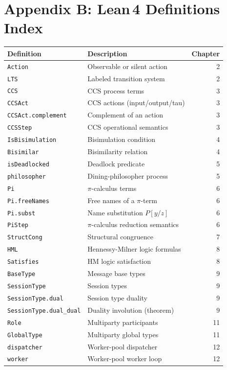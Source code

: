 \documentclass[11pt, a4paper, oneside]{book}
\newcommand{\lc}[1]{\texttt{#1}}
\begin{document}
\chapter*{Appendix B: Lean\,4 Definitions Index}

\begin{center}
\begin{tabular}{llr}
  \toprule
  \textbf{Definition} & \textbf{Description} & \textbf{Chapter} \\
  \midrule
  \lc{Action} & Observable or silent action & 2 \\
  \lc{LTS} & Labeled transition system & 2 \\
  \lc{CCS} & CCS process terms & 3 \\
  \lc{CCSAct} & CCS actions (input/output/tau) & 3 \\
  \lc{CCSAct.complement} & Complement of an action & 3 \\
  \lc{CCSStep} & CCS operational semantics & 3 \\
  \lc{IsBisimulation} & Bisimulation condition & 4 \\
  \lc{Bisimilar} & Bisimilarity relation & 4 \\
  \lc{isDeadlocked} & Deadlock predicate & 5 \\
  \lc{philosopher} & Dining-philosopher process & 5 \\
  \lc{Pi} & $\pi$-calculus terms & 6 \\
  \lc{Pi.freeNames} & Free names of a $\pi$-term & 6 \\
  \lc{Pi.subst} & Name substitution $P[y/z]$ & 6 \\
  \lc{PiStep} & $\pi$-calculus reduction semantics & 6 \\
  \lc{StructCong} & Structural congruence & 7 \\
  \lc{HML} & Hennessy-Milner logic formulas & 8 \\
  \lc{Satisfies} & HM logic satisfaction & 8 \\
  \lc{BaseType} & Message base types & 9 \\
  \lc{SessionType} & Session types & 9 \\
  \lc{SessionType.dual} & Session type duality & 9 \\
  \lc{SessionType.dual\_dual} & Duality involution (theorem) & 9 \\
  \lc{Role} & Multiparty participants & 11 \\
  \lc{GlobalType} & Multiparty global types & 11 \\
  \lc{dispatcher} & Worker-pool dispatcher & 12 \\
  \lc{worker} & Worker-pool worker loop & 12 \\
  \bottomrule
\end{tabular}
\end{center}
\end{document}
